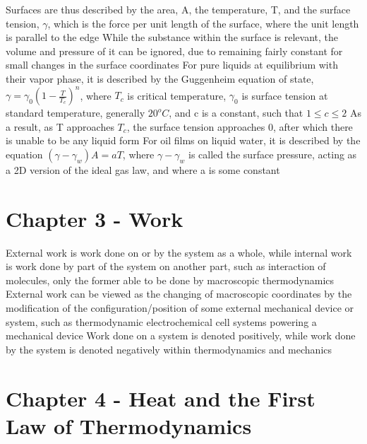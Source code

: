 \documentclass[11 pt, twoside]{article}
\newenvironment{outline*}
{
	\begin{outline}[enumerate]
	}
	{\end{outline}
}
\begin{document}
\begin{outline*}
\2 Surfaces are thus described by the area, A, the temperature, T, and the surface tension, $\gamma$, which is the force per unit length of the surface, where the unit length is parallel to the edge
\2 While the substance within the surface is relevant, the volume and pressure of it can be ignored, due to remaining fairly constant for small changes in the surface coordinates
\2 For pure liquids at equilibrium with their vapor phase, it is described by the Guggenheim equation of state, $\gamma = \gamma_0(1 - \frac{T}{T_c})^n$, where $T_c$ is critical temperature, $\gamma_0$ is surface tension at standard temperature, generally $20^o C$, and c is a constant, such that $1 \leq c \leq 2$
\3 As a result, as T approaches $T_c$, the surface tension approaches 0, after which there is unable to be any liquid form
\2 For oil films on liquid water, it is described by the equation $(\gamma - \gamma_w)A = aT$, where $\gamma - \gamma_w$ is called the surface pressure, acting as a 2D version of the ideal gas law, and where a is some constant
\end{outline*}
\section{Chapter 3 - Work}
\begin{outline*}
\1 External work is work done on or by the system as a whole, while internal work is work done by part of the system on another part, such as interaction of molecules, only the former able to be done by macroscopic thermodynamics
\2 External work can be viewed as the changing of macroscopic coordinates by the modification of the configuration/position of some external mechanical device or system, such as thermodynamic electrochemical cell systems powering a mechanical device
\2 Work done on a system is denoted positively, while work done by the system is denoted negatively within thermodynamics and mechanics
\1 
\end{outline*}
\section{Chapter 4 - Heat and the First Law of Thermodynamics}
\begin{outline*}

\end{outline*}
\end{document}
